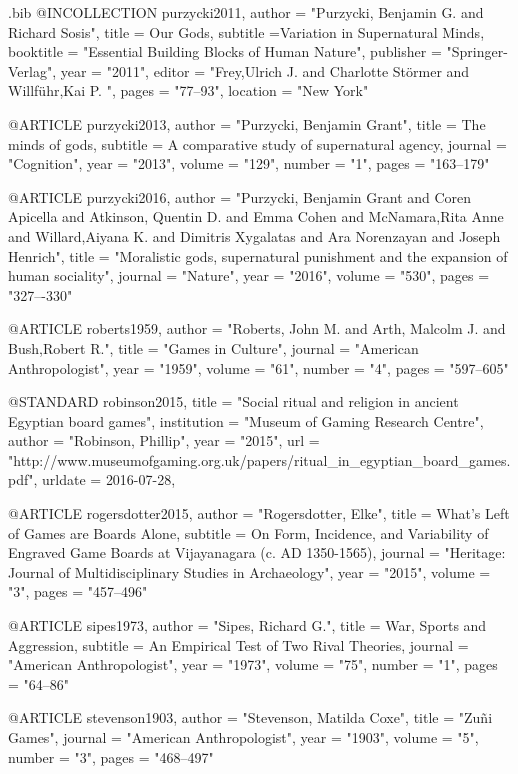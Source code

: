 \begin{filecontents}{\IJSRAidentifier.bib}
@INCOLLECTION {purzycki2011,
	author    = "Purzycki, Benjamin G. and Richard Sosis",
	title     = {Our Gods},
	subtitle ={Variation in Supernatural Minds},
	booktitle = "Essential Building Blocks of Human Nature",
	publisher = "Springer-Verlag",
	year      = "2011",
	editor    = "Frey,Ulrich J.  and Charlotte Störmer and Willführ,Kai P. ",
	pages     = "77--93",
	location   = "New York"
}

@ARTICLE {purzycki2013,
	author  = "Purzycki, Benjamin Grant",
	title   = {The minds of gods},
	subtitle = {A comparative study of supernatural agency},
	journal = "Cognition",
	year    = "2013",
	volume  = "129",
	number  = "1",
	pages   = "163--179"
}

@ARTICLE {purzycki2016,
	author  = "Purzycki, Benjamin Grant and  Coren Apicella and   Atkinson, Quentin D. and  Emma Cohen and  McNamara,Rita Anne  and  Willard,Aiyana K.  and Dimitris Xygalatas and Ara Norenzayan and Joseph Henrich",
	title   = "Moralistic gods, supernatural punishment and the expansion of human sociality",
	journal = "Nature",
	year    = "2016",
	volume  = "530",
	pages   = "327–-330"
}

@ARTICLE {roberts1959,
	author  = "Roberts, John M. and Arth, Malcolm J.  and Bush,Robert R.",
	title   = "Games in Culture",
	journal = "American Anthropologist",
	year    = "1959",
	volume  = "61",
	number  = "4",
	pages   = "597--605"
}

@STANDARD {robinson2015,
	title       = "Social ritual and religion in ancient Egyptian board games",
	institution = "Museum of Gaming Research Centre",
	author      = "Robinson, Phillip",
	year        = "2015",
	url         = "http://www.museumofgaming.org.uk/papers/ritual_in_egyptian_board_games.pdf",
	urldate = {2016-07-28},
}

@ARTICLE {rogersdotter2015,
	author  = "Rogersdotter, Elke",
	title   = {What’s Left of Games are Boards Alone},
	subtitle = {On Form, Incidence, and Variability of Engraved Game Boards at Vijayanagara (c. AD 1350-1565)},
	journal = "Heritage: Journal of Multidisciplinary Studies in Archaeology",
	year    = "2015",
	volume  = "3",
	pages   = "457--496"
}

@ARTICLE {sipes1973,
	author  = "Sipes, Richard G.",
	title   = {War, Sports and Aggression},
	subtitle = {An Empirical Test of Two Rival Theories},
	journal = "American Anthropologist",
	year    = "1973",
	volume  = "75",
	number  = "1",
	pages   = "64--86"
}

@ARTICLE {stevenson1903,
	author  = "Stevenson, Matilda Coxe",
	title   = "Zuñi Games",
	journal = "American Anthropologist",
	year    = "1903",
	volume  = "5",
	number  = "3",
	pages   = "468--497"
}


\end{filecontents}
